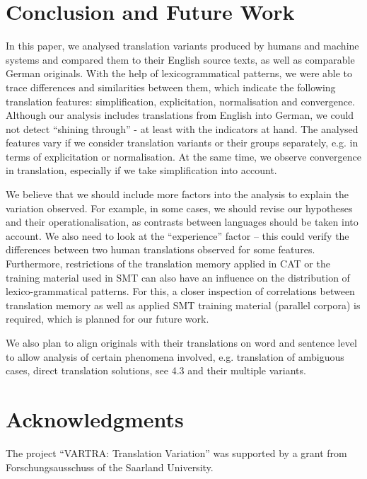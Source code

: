 \documentclass[output=paper]{LSP/langsci}
\begin{document}
\section{Conclusion and Future Work}

In this paper, we analysed translation variants produced by humans and machine systems and compared them to their English source texts, as well as comparable German originals. With the help of lexicogrammatical patterns, we were able to trace differences and similarities between them, which indicate the following translation features: simplification, explicitation, normalisation and convergence. Although our analysis includes translations from English into German, we could not detect “shining through” - at least with the indicators at hand. The analysed features vary if we consider translation variants or their groups separately, e.g. in terms of explicitation or normalisation. At the same time, we observe convergence in translation, especially if we take simplification into account.

We believe that we should include more factors into the analysis to explain the variation observed. For example, in some cases, we should revise our hypotheses and their operationalisation, as contrasts between languages should be taken into account. We also need to look at the “experience” factor – this could verify the differences between two human translations observed for some features. Furthermore, restrictions of the translation memory applied in CAT or the training material used in SMT can also have an influence on the distribution of lexico-grammatical patterns. For this, a closer inspection of correlations between translation memory as well as applied SMT training material (parallel corpora) is required, which is planned for our future work.

We also plan to align originals with their translations on word and sentence level to allow analysis of certain phenomena involved, e.g. translation of ambiguous cases, direct translation solutions, see 4.3 and their multiple variants.

\section{Acknowledgments}
The project “VARTRA: Translation Variation” was supported by a grant from Forschungsausschuss of the Saarland University.


\printbibliography[heading=subbibliography,notkeyword=this]
\end{document}
